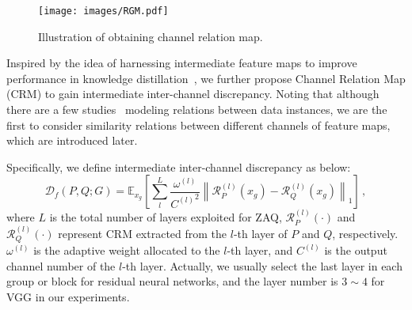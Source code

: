 \documentclass[final]{cvpr}
\begin{document}
\begin{figure}[!t]
  \centering
  \texttt{[image: images/RGM.pdf]}
  \caption{Illustration of obtaining channel relation map.}
  \label{fig:RGM}
\end{figure}

Inspired by the idea of harnessing intermediate feature maps to improve performance in knowledge distillation~\cite{zagoruyko2016paying,park2019relational}, we further propose Channel Relation Map (CRM) to gain intermediate inter-channel discrepancy.
Noting that although there are a few studies~\cite{park2019relational,liu2019knowledge} modeling relations between data instances, we are the first to consider similarity relations between different channels of feature maps, which are introduced later.

Specifically, we define intermediate inter-channel discrepancy as below:
\begin{equation}
  \label{eq:D_f}
  \mathcal{D}_{f}(P,Q;G) = \mathbb{E}_{x_g}\left[\sum_{l}^{L} \frac{\omega^{(l)}}{{C^{(l)}}^2} \left\| \mathcal{R}^{(l)}_{P}(x_g) - \mathcal{R}^{(l)}_{Q}(x_g) \right\|_{1}\right]\,,
\end{equation}
where $L$ is the total number of layers exploited for ZAQ, $\mathcal{R}^{(l)}_{P}(\cdot)$ and $\mathcal{R}^{(l)}_{Q}(\cdot)$ represent CRM extracted from the $l$-th layer of $P$ and $Q$, respectively.
$\omega^{(l)}$ is the adaptive weight allocated to the $l$-th layer, and $C^{(l)}$ is the output channel number of the $l$-th layer. 
Actually, we usually select the last layer in each group or block for residual neural networks, and the layer number is $3\sim4$ for VGG in our experiments.  
\end{document}
